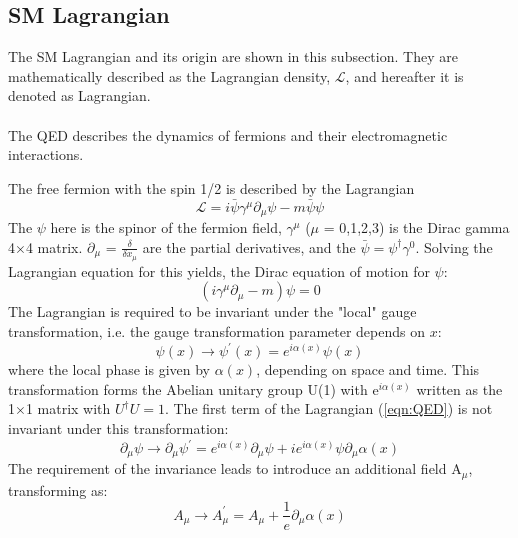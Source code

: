 \subsection{SM Lagrangian}
\label{subsec:Lagrangian}
The SM Lagrangian and its origin are shown in this subsection. 
They are mathematically described as the Lagrangian density, $\mathcal{L}$, and hereafter it is denoted as Lagrangian.\\

\noindent\textbf{} \\ 
The QED describes the dynamics of fermions and their electromagnetic interactions.

The free fermion with the spin 1/2 is described by the Lagrangian\\
\begin{equation}
\label{eqn:QED}
\mathcal{L}=i \bar{\psi} \gamma^{\mu} \partial_{\mu} \psi-m \bar{\psi} \psi
\end{equation}
The $\psi$ here is the spinor of the fermion field, $\gamma^{\mu}$  ($\mu$ = 0,1,2,3) is the Dirac gamma 4$\times$4 matrix. $\partial_{\mu}$ = $\frac{\delta}{\delta x_{\mu}}$ are the partial derivatives, and the $\bar{\psi}=\psi^{\dagger} \gamma^{0}$.
Solving the Lagrangian equation for this yields, the Dirac equation of motion for $\psi$:
\begin{equation}
\left(i \gamma^{\mu} \partial_{\mu}-m\right) \psi=0
\end{equation}
The Lagrangian is required to be invariant under the "local" gauge transformation, i.e. the gauge transformation parameter depends on $x$:
\begin{equation}
\psi(x) \rightarrow \psi^{\prime}(x)=e^{i \alpha(x)} \psi(x)
\end{equation}
where the local phase is given by $\alpha(x)$, depending on space and time. 
This transformation forms the Abelian unitary group U(1) with e$^{i\alpha(x)}$ written as the 1$\times$1 matrix with $U^{\dagger} U=1$.
The first term of the Lagrangian (\ref{eqn:QED}) is not invariant under this transformation:
\begin{equation}
\partial_{\mu} \psi \rightarrow \partial_{\mu} \psi^{\prime}=e^{i \alpha(x)} \partial_{\mu} \psi+i e^{i \alpha(x)} \psi \partial_{\mu} \alpha(x)
\end{equation}
The requirement of the invariance leads to introduce an additional field A$_\mu$, transforming as:
\begin{equation}
A_{\mu} \rightarrow A_{\mu}^{\prime}=A_{\mu}+\frac{1}{e} \partial_{\mu} \alpha(x)
\end{equation}
